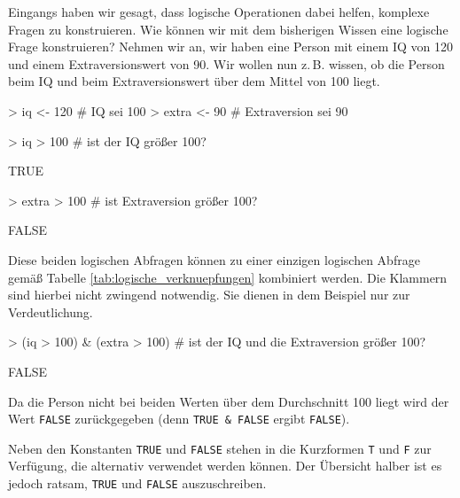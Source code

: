Eingangs haben wir gesagt, dass logische Operationen dabei helfen, komplexe Fragen zu konstruieren. Wie können wir mit dem bisherigen Wissen eine logische Frage konstruieren? Nehmen wir an, wir haben eine Person mit einem IQ von 120 und einem Extraversionswert von 90. Wir wollen nun z.\,B. wissen, ob die Person beim IQ und beim Extraversionswert über dem Mittel von 100 liegt.

\begin{Schunk}
\begin{Sinput}
> iq <- 120         # IQ sei 100
> extra <- 90       # Extraversion sei 90
\end{Sinput}
\end{Schunk}

\begin{Schunk}
\begin{Sinput}
> iq > 100          # ist der IQ größer 100?
\end{Sinput}
\begin{Soutput}
[1] TRUE
\end{Soutput}
\begin{Sinput}
> extra > 100       # ist Extraversion größer 100?
\end{Sinput}
\begin{Soutput}
[1] FALSE
\end{Soutput}
\end{Schunk}
 
Diese beiden logischen Abfragen können zu einer einzigen logischen Abfrage gemäß Tabelle \ref{tab:logische_verknuepfungen} kombiniert werden. Die Klammern sind hierbei nicht zwingend notwendig. Sie dienen in dem Beispiel nur zur Verdeutlichung.  

\begin{Schunk}
\begin{Sinput}
> (iq > 100) & (extra > 100)   # ist der IQ und die Extraversion größer 100?
\end{Sinput}
\begin{Soutput}
[1] FALSE
\end{Soutput}
\end{Schunk}

Da die Person nicht bei beiden Werten über dem Durchschnitt 100 liegt wird der Wert \verb!FALSE! zurückgegeben (denn \verb!TRUE & FALSE! ergibt \verb!FALSE!).

Neben den Konstanten \verb!TRUE! und \verb!FALSE! stehen in \R{} die Kurzformen \verb!T! und \verb!F! zur Verfügung, die alternativ verwendet werden können. Der Übersicht halber ist es jedoch ratsam, \texttt{TRUE} und \texttt{FALSE}  auszuschreiben.

